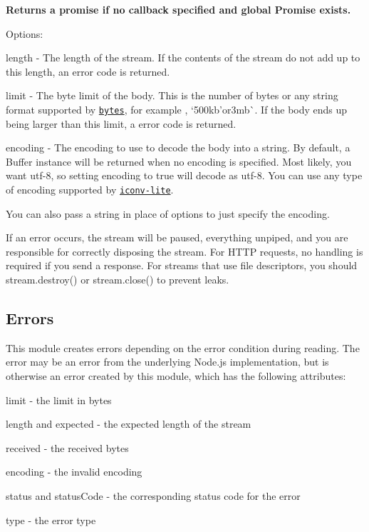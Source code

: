 {\bfseries Returns a promise if no callback specified and global {\ttfamily Promise} exists.}

Options\+:


\begin{DoxyItemize}
\item {\ttfamily length} -\/ The length of the stream. If the contents of the stream do not add up to this length, an {} error code is returned.
\item {\ttfamily limit} -\/ The byte limit of the body. This is the number of bytes or any string format supported by \href{https://www.npmjs.com/package/bytes}{\tt bytes}, for example {}, `\textquotesingle{}500kb'{\ttfamily or}\textquotesingle{}3mb\textquotesingle{}\`{}. If the body ends up being larger than this limit, a {} error code is returned.
\item {\ttfamily encoding} -\/ The encoding to use to decode the body into a string. By default, a {\ttfamily Buffer} instance will be returned when no encoding is specified. Most likely, you want {\ttfamily utf-\/8}, so setting {\ttfamily encoding} to {\ttfamily true} will decode as {\ttfamily utf-\/8}. You can use any type of encoding supported by \href{https://www.npmjs.org/package/iconv-lite#readme}{\tt iconv-\/lite}.
\end{DoxyItemize}

You can also pass a string in place of options to just specify the encoding.

If an error occurs, the stream will be paused, everything unpiped, and you are responsible for correctly disposing the stream. For H\+T\+TP requests, no handling is required if you send a response. For streams that use file descriptors, you should {\ttfamily stream.\+destroy()} or {\ttfamily stream.\+close()} to prevent leaks.

\subsection*{Errors}

This module creates errors depending on the error condition during reading. The error may be an error from the underlying Node.\+js implementation, but is otherwise an error created by this module, which has the following attributes\+:


\begin{DoxyItemize}
\item {\ttfamily limit} -\/ the limit in bytes
\item {\ttfamily length} and {\ttfamily expected} -\/ the expected length of the stream
\item {\ttfamily received} -\/ the received bytes
\item {\ttfamily encoding} -\/ the invalid encoding
\item {\ttfamily status} and {\ttfamily status\+Code} -\/ the corresponding status code for the error
\item {\ttfamily type} -\/ the error type
\end{DoxyItemize}

